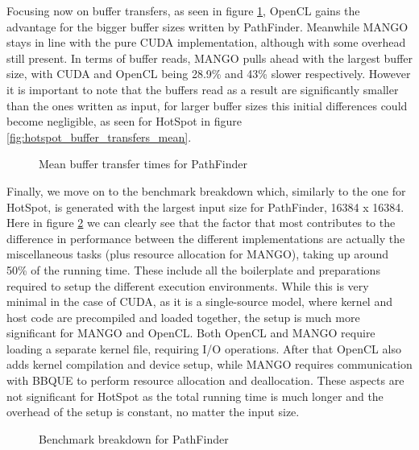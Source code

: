Focusing now on buffer transfers, as seen in figure \ref{fig:pathfinder_buffer_transfers_mean}, OpenCL gains the advantage for the bigger buffer sizes written by PathFinder. Meanwhile MANGO stays in line with the pure CUDA implementation, although with some overhead still present. In terms of buffer reads, MANGO pulls ahead with the largest buffer size, with CUDA and OpenCL being 28.9\% and 43\% slower respectively. However it is important to note that the buffers read as a result are significantly smaller than the ones written as input, for larger buffer sizes this initial differences could become negligible, as seen for HotSpot in figure \ref{fig:hotspot_buffer_transfers_mean}.

\begin{figure}%
    \centering
    \qquad
    \captionsetup{justification=centering}
    \caption{Mean buffer transfer times for PathFinder}%
    \label{fig:pathfinder_buffer_transfers_mean}%
\end{figure}

Finally, we move on to the benchmark breakdown which, similarly to the one for HotSpot, is generated with the largest input size for PathFinder, 16384 x 16384. Here in figure \ref{fig:pathfinder_breakdown} we can clearly see that the factor that most contributes to the difference in performance between the different implementations are actually the miscellaneous tasks (plus resource allocation for MANGO), taking up around 50\% of the running time. These include all the boilerplate and preparations required to setup the different execution environments. While this is very minimal in the case of CUDA, as it is a single-source model, where kernel and host code are precompiled and loaded together, the setup is much more significant for MANGO and OpenCL. Both OpenCL and MANGO require loading a separate kernel file, requiring I/O operations. After that OpenCL also adds kernel compilation and device setup, while MANGO requires communication with BBQUE to perform resource allocation and deallocation. These aspects are not significant for HotSpot as the total running time is much longer and the overhead of the setup is constant, no matter the input size.

\begin{figure}
    \centering
    \resizebox{!}{160pt}{
        
    }
    \captionsetup{justification=centering}
    \caption{Benchmark breakdown for PathFinder}
    \label{fig:pathfinder_breakdown}
\end{figure}

